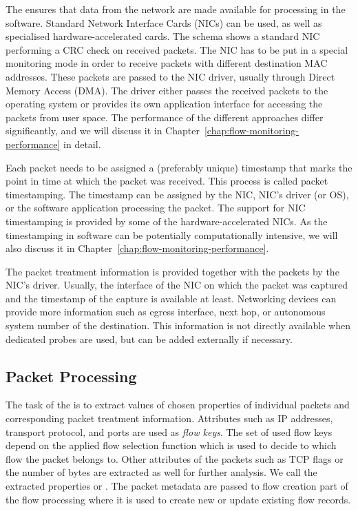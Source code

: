 The  ensures that data from the network are made available for processing in the software. Standard Network Interface Cards (NICs) can be used, as well as specialised hardware-accelerated cards. The schema shows a standard NIC performing a CRC check on received packets. The NIC has to be put in a special monitoring mode in order to receive packets with different destination MAC addresses. These packets are passed to the NIC driver, usually through Direct Memory Access (DMA). The driver either passes the received packets to the operating system or provides its own application interface for accessing the packets from user space. The performance of the different approaches differ significantly, and we will discuss it in Chapter~\ref{chap:flow-monitoring-performance} in detail.

Each packet needs to be assigned a (preferably unique) timestamp that marks the point in time at which the packet was received. This process is called packet timestamping. The timestamp can be assigned by the NIC, NIC's driver (or OS), or the software application processing the packet. The support for NIC timestamping is provided by some of the hardware-accelerated NICs. As the timestamping in software can be potentially computationally intensive, we will also discuss it in Chapter~\ref{chap:flow-monitoring-performance}.

The packet treatment information is provided together with the packets by the NIC's driver. Usually, the interface of the NIC on which the packet was captured and the timestamp of the capture is available at least. Networking devices can provide more information such as egress interface, next hop, or autonomous system number of the destination. This information is not directly available when dedicated probes are used, but can be added externally if necessary.

\subsection{Packet Processing}\label{subsec:packet-processing}

The task of the  is to extract values of chosen properties of individual packets and corresponding packet treatment information. Attributes such as IP addresses, transport protocol, and ports are used as \emph{flow keys}. The set of used flow keys depend on the applied flow selection function which is used to decide to which flow the packet belongs to. Other attributes of the packets such as TCP flags or the number of bytes are extracted as well for further analysis. We call the extracted properties \emph{} or \emph{}. The packet metadata are passed to flow creation part of the flow processing where it is used to create new or update existing flow records.

